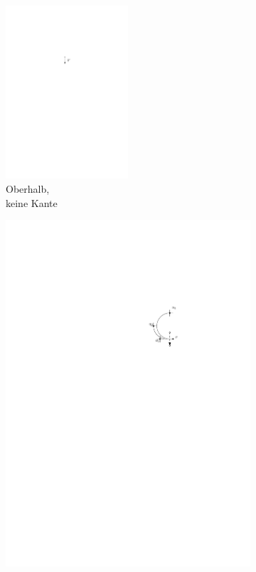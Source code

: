 \documentclass[a4paper]{scrreprt}
\theoremstyle{definition}
\begin{document}
\begin{figure}[h]
        \centering
        \begin{subfigure}[b]{0.2\textwidth}
                \includegraphics[width=0.5\textwidth]{schnitt_finden/top_none}
                \caption{Oberhalb,\\ keine Kante}
                \label{fig:cutfinding_top_none}
        \end{subfigure}%
        \quad
        \begin{subfigure}[b]{0.2\textwidth}
                \includegraphics[width=\textwidth]{schnitt_finden/top_upwards}

\end{subfigure}
\end{figure}
\end{document}
